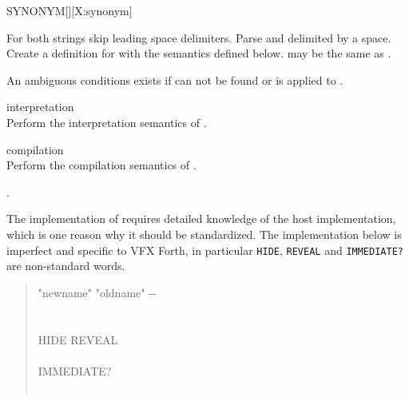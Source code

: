 \begin{worddef*}{}{SYNONYM}[][X:synonym]
\item {}

	For both strings skip leading space delimiters.  Parse 
	and  delimited by a space.  Create a definition for
	 with the semantics defined below.
	 may be the same as .

	An ambiguous conditions exists if  can not be found or
	 is applied to .

\item[\param{newname} interpretation]
	 \\
	Perform the interpretation semantics of .

\item[\param{newname} compilation]
	 \\
	Perform the compilation semantics of .

\see {}.

	\begin{implement}
		\dffamily
		The implementation of  requires detailed knowledge
		of the host implementation, which is one reason why it should be
		standardized.  The implementation below is imperfect and specific
		to VFX Forth, in particular \texttt{HIDE}, \texttt{REVEAL} and
		\texttt{IMMEDIATE?} are non-standard words.

		\begin{quote}\ttfamily
			\word{:}   "newname" "oldname" -{-} \\
			  \\
			\tab {}  \\
			\tab[2] HIDE  \word{,} REVEAL \\
			\tab {} \\
			\tab[2]       IMMEDIATE?  \\
			\tab[2]      \\
			\word{;}
		\end{quote}
	\end{implement}
\end{worddef*}

